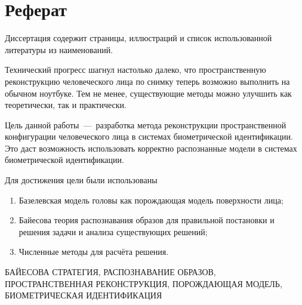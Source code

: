 \chapter*{Реферат}

Диссертация содержит \pageref{LastPage} страницы,
 иллюстраций
и список использованной литературы из
 наименований.

Технический прогресс шагнул настолько далеко,
что пространственную реконструкцию человеческого лица по снимку
теперь возможно выполнить на обычном ноутбуке.
Тем не менее,
существующие методы можно улучшить как теоретически, так и практически.

Цель данной работы~---~разработка метода
реконструкции пространственной конфигурации человеческого лица
в системах биометрической идентификации.
Это даст возможность использовать корректно распознанные модели
в системах биометрической идентификации.

Для достижения цели были использованы
\begin{enumerate}
  \item
    Базелевская модель головы
    как порождающая модель поверхности лица;
  \item
    Байесова теория распознавания образов
    для правильной постановки и решения задачи и анализа существующих решений;
  \item
    Численные методы для расчёта решения.
\end{enumerate}

\MakeUppercase{байесова стратегия, распознавание образов,
пространственная реконструкция, порождающая модель,
биометрическая идентификация}

